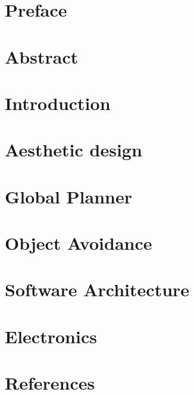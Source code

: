 \documentclass[a4paper,10pt,titlepage]{report}
\begin{document}

\newpage


\newpage
{}

\newcommand{\todo}[1]{\textbf{\textsc{\textcolor{red}{[#1]}}}}

\chapter*{Preface}

\label{preface}

\chapter*{Abstract}

\label{abstract}
\newpage

\tableofcontents

\chapter*{Introduction}

\label{introduction}

\chapter*{Aesthetic design}

\label{aesthetic_design}

\chapter*{Global Planner}

\label{global_planner}

\chapter*{Object Avoidance}

\label{object_avoidance}

\chapter*{Software Architecture}
\label{Software Architecture}


\chapter*{Electronics}

\label{electronics}

\chapter*{References}
\label{references}





\end{document}
